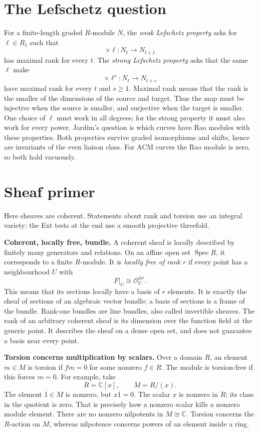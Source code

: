 \documentclass[11pt,a4paper]{article}
\theoremstyle{remark}
\begin{document}
\section{The Lefschetz question}

For a finite-length graded $R$-module
$N$, the \emph{weak Lefschetz property}
asks for $\ell\in R_1$ such that
$$
\times\ell:N_t\longrightarrow N_{t+1}
$$
has maximal rank for every $t$.
The \emph{strong Lefschetz property}
asks that the same $\ell$ make
$$
\times\ell^s:N_t\longrightarrow N_{t+s}
$$
have maximal rank for every $t$ and
$s\geq1$.
Maximal rank means that the rank is
the smaller of the dimensions of the
source and target. Thus the map must
be injective when the source is
smaller, and surjective when the
target is smaller. One choice of
$\ell$ must work in all degrees;
for the strong property it must also
work for every power.
Jardim's question is which curves
have Rao modules with these properties.
Both properties survive graded
isomorphisms and shifts, hence are
invariants of the even liaison class.
For ACM curves the Rao module is zero,
so both hold vacuously.

\clearpage
\appendix
\section{Sheaf primer}
\label{appendix-primer}

Here sheaves are coherent. Statements
about rank and torsion use an integral
variety; the Ext tests at the end use
a smooth projective threefold.

\textbf{Coherent, locally free, bundle.}
A coherent sheaf is locally described
by finitely many generators and
relations. On an affine open set
$\operatorname{Spec}R$, it corresponds
to a finite $R$-module.
It is \emph{locally free of rank $r$}
if every point has a neighbourhood $U$
with
$$
F|_U\cong\mathcal{O}_U^{\oplus r}.
$$
This means that its sections locally
have a basis of $r$ elements. It is
exactly the sheaf of sections of an
algebraic vector bundle; a basis of
sections is a frame of the bundle.
Rank-one bundles are line bundles,
also called invertible sheaves.
The rank of an arbitrary coherent
sheaf is its dimension over the
function field at the generic point.
It describes the sheaf on a dense
open set, and does not guarantee a
basis near every point.

\textbf{Torsion concerns multiplication
by scalars.}
Over a domain $R$, an element $m\in M$
is torsion if $fm=0$ for some nonzero
$f\in R$. The module is torsion-free
if this forces $m=0$.
For example, take
$$
R=\mathbb{C}[x],\qquad M=R/(x).
$$
The element $\overline 1\in M$ is
nonzero, but $x\overline 1=0$.
The scalar $x$ is nonzero in $R$;
its class in the quotient is zero.
That is precisely how a nonzero
scalar kills a nonzero module element.
There are no nonzero nilpotents in
$M\cong\mathbb{C}$. Torsion concerns
the $R$-action on $M$, whereas
nilpotence concerns powers of an
element inside a ring.
\end{document}
